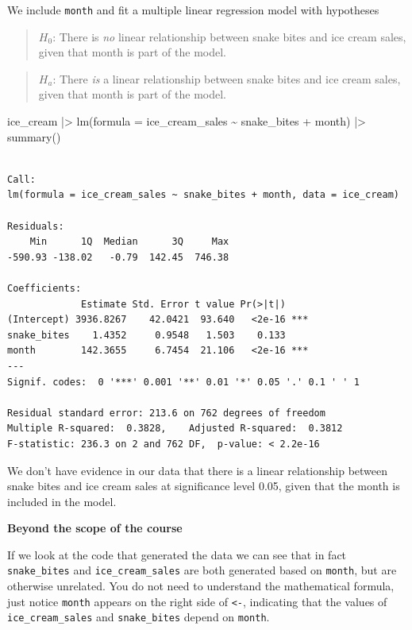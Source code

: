\documentclass[
  letterpaper,
  DIV=11,
  numbers=noendperiod]{scrreprt}
\newenvironment{Shaded}{\begin{snugshade}}{\end{snugshade}}
\newcommand{\AttributeTok}[1]{\textcolor[rgb]{0.40,0.45,0.13}{#1}}
\newcommand{\FunctionTok}[1]{\textcolor[rgb]{0.28,0.35,0.67}{#1}}
\newcommand{\NormalTok}[1]{\textcolor[rgb]{0.00,0.23,0.31}{#1}}
\newcommand{\SpecialCharTok}[1]{\textcolor[rgb]{0.37,0.37,0.37}{#1}}
\begin{document}
We include \texttt{month} and fit a multiple linear regression model
with hypotheses

\begin{quote}
\textbf{\(H_0\)}: There is \emph{no} linear relationship between snake
bites and ice cream sales, given that month is part of the model.
\end{quote}

\begin{quote}
\textbf{\(H_a\)}: There \emph{is} a linear relationship between snake
bites and ice cream sales, given that month is part of the model.
\end{quote}

\begin{Shaded}
\begin{Highlighting}[]
\NormalTok{ice\_cream }\SpecialCharTok{|\textgreater{}} 
  \FunctionTok{lm}\NormalTok{(}\AttributeTok{formula =}\NormalTok{ ice\_cream\_sales }\SpecialCharTok{\textasciitilde{}}\NormalTok{ snake\_bites }\SpecialCharTok{+}\NormalTok{ month) }\SpecialCharTok{|\textgreater{}} 
  \FunctionTok{summary}\NormalTok{()}
\end{Highlighting}
\end{Shaded}

\begin{verbatim}

Call:
lm(formula = ice_cream_sales ~ snake_bites + month, data = ice_cream)

Residuals:
    Min      1Q  Median      3Q     Max 
-590.93 -138.02   -0.79  142.45  746.38 

Coefficients:
             Estimate Std. Error t value Pr(>|t|)    
(Intercept) 3936.8267    42.0421  93.640   <2e-16 ***
snake_bites    1.4352     0.9548   1.503    0.133    
month        142.3655     6.7454  21.106   <2e-16 ***
---
Signif. codes:  0 '***' 0.001 '**' 0.01 '*' 0.05 '.' 0.1 ' ' 1

Residual standard error: 213.6 on 762 degrees of freedom
Multiple R-squared:  0.3828,    Adjusted R-squared:  0.3812 
F-statistic: 236.3 on 2 and 762 DF,  p-value: < 2.2e-16
\end{verbatim}

We don't have evidence in our data that there is a linear relationship
between snake bites and ice cream sales at significance level 0.05,
given that the month is included in the model.

\textbf{Beyond the scope of the course}

If we look at the code that generated the data we can see that in fact
\texttt{snake\_bites} and \texttt{ice\_cream\_sales} are both generated
based on \texttt{month}, but are otherwise unrelated. You do not need to
understand the mathematical formula, just notice \texttt{month} appears
on the right side of \texttt{\textless{}-}, indicating that the values
of \texttt{ice\_cream\_sales} and \texttt{snake\_bites} depend on
\texttt{month}.
\end{document}
